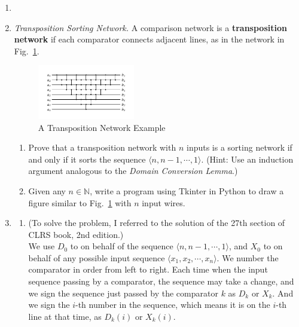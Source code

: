 \documentclass[12pt,a4paper]{article}
\makeatletter
\newtheorem*{solution}{Solution}
\theoremstyle{definition}
\renewenvironment{solution}[1][Solution] {\par\pushQED{\qed}\normalfont\topsep6\p@\@plus6\p@\relax\trivlist\item[\hskip\labelsep\bfseries#1\@addpunct{.}]\ignorespaces}{\popQED\endtrivlist\@endpefalse} \makeatother
\makeatother
\begin{document}
\begin{enumerate}
\begin{solution}
\begin{enumerate}
\end{enumerate}
\end{solution}
\item
\textit{Transposition Sorting Network.} A comparison network is a \textbf{transposition network}  if each comparator connects adjacent lines, as in the network in Fig.~\ref{Fig-Transposition}.

\begin{figure}[htbp]
    \centering
    \includegraphics[width=0.4\textwidth]{Fig-Transposition.pdf}
    \caption{A Transposition Network Example}\label{Fig-Transposition}
\end{figure}

\begin{enumerate}
\item Prove that a transposition network with $n$ inputs is a sorting network if and only if it sorts the sequence $\langle n, n-1, \cdots, 1 \rangle$. {\color{blue}(Hint: Use an induction argument analogous to the \emph{Domain Conversion Lemma}.)}
\item {\color{red}{(Optional Sub-question with Bonus)}} Given any $n \in \mathbb{N}$, write a program using Tkinter in Python to draw a figure similar to Fig.~\ref{Fig-Transposition} with $n$ input wires.
\end{enumerate}

\begin{solution}

\begin{enumerate}
\item 

(To solve the problem, I referred to the solution of the 27th section of CLRS book, 2nd edition.)\\

We use $D_0$ to on behalf of the sequence $\langle n, n-1, \cdots, 1 \rangle$, and $X_0$ to on behalf of any possible input sequence $\langle x_1, x_2, \cdots, x_n \rangle$. We number the comparator in order from left to right. Each time when the input sequence passing by a comparator, the sequence may take a change, and we sign the sequence just passed by the comparator $k$ as $D_k$ or $X_k$. And we sign the $i$-th number in the sequence, which means it is on the $i$-th line at that time, as $D_k(i)$ or $X_k(i)$.\\
 

\end{enumerate}
\end{solution}
\end{enumerate}
\end{document}

